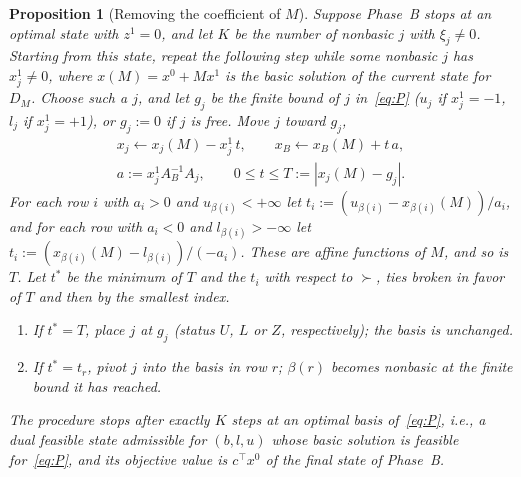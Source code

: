\documentclass[11pt,a4paper]{article}
\theoremstyle{plain}
\newtheorem{proposition}[theorem]{Proposition}
\theoremstyle{definition}
\theoremstyle{remark}
\begin{document}
\begin{proposition}[Removing the coefficient of $M$]
\label{prop:cleanup}
Suppose Phase~B stops at an optimal state with $z^1=0$, and let $K$ be the number of nonbasic $j$ with $\xi_j\neq0$. Starting from this state, repeat the following step while some nonbasic $j$ has $x^1_j\neq0$, where $x(M)=x^0+Mx^1$ is the basic solution of the current state for $D_M$. Choose such a $j$, and let $g_j$ be the finite bound of $j$ in~\eqref{eq:P} ($u_j$ if $x^1_j=-1$, $l_j$ if $x^1_j=+1$), or $g_j:=0$ if $j$ is free. Move $j$ toward $g_j$,
\begin{gather*}
  x_j\gets x_j(M)-x^1_j\,t,\qquad x_B\gets x_B(M)+t\,a,\\
  a:=x^1_jA_B^{-1}A_j,\qquad 0\le t\le T:=|x_j(M)-g_j|.
\end{gather*}
For each row $i$ with $a_i>0$ and $u_{\beta(i)}<+\infty$ let $t_i:=(u_{\beta(i)}-x_{\beta(i)}(M))/a_i$, and for each row with $a_i<0$ and $l_{\beta(i)}>-\infty$ let $t_i:=(x_{\beta(i)}(M)-l_{\beta(i)})/(-a_i)$. These are affine functions of $M$, and so is $T$. Let $t^\ast$ be the minimum of $T$ and the $t_i$ with respect to $\succ$, ties broken in favor of $T$ and then by the smallest index.
\begin{enumerate}[label=(\Alph*)]
\item If $t^\ast=T$, place $j$ at $g_j$ (status $U$, $L$ or $Z$, respectively); the basis is unchanged.
\item If $t^\ast=t_r$, pivot $j$ into the basis in row $r$; $\beta(r)$ becomes nonbasic at the finite bound it has reached.
\end{enumerate}
The procedure stops after exactly $K$ steps at an optimal basis of~\eqref{eq:P}, i.e., a dual feasible state admissible for $(b,l,u)$ whose basic solution is feasible for~\eqref{eq:P}, and its objective value is $c^\top x^0$ of the final state of Phase~B.
\end{proposition}
\end{document}
